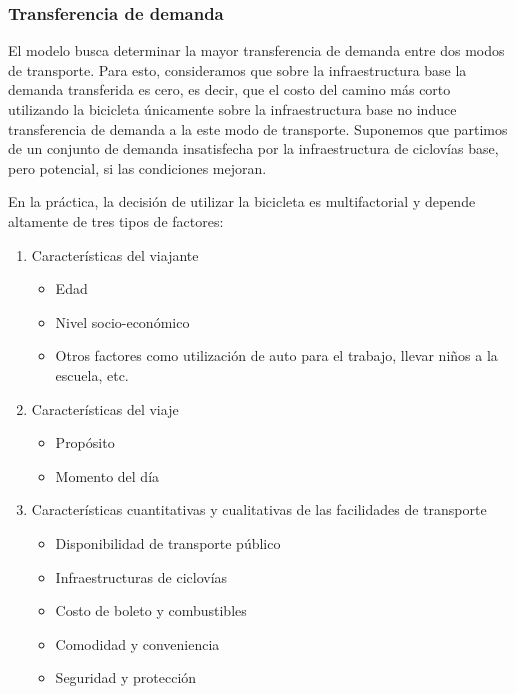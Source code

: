 \documentclass{article}
\begin{document}
  \subsubsection*{Transferencia de demanda}

  El modelo busca determinar la mayor transferencia de demanda entre dos modos de transporte. Para esto, consideramos que sobre la infraestructura base la demanda transferida es cero, es decir, que el costo del camino más corto utilizando la bicicleta únicamente sobre la infraestructura base no induce transferencia de demanda a la este modo de transporte. Suponemos que partimos de un conjunto de demanda insatisfecha por la infraestructura de ciclovías base, pero potencial, si las condiciones mejoran.

  En la práctica, la decisión de utilizar la bicicleta es multifactorial y depende altamente de tres tipos de factores:

  \begin{enumerate}
    \item{
        Características del viajante
          \begin{itemize}
            \item{Edad}
            \item{Nivel socio-económico}
            \item{Otros factores como utilización de auto para el trabajo, llevar niños a la escuela, etc.}
          \end{itemize}
    }
    \item{
        Características del viaje
          \begin{itemize}
            \item{Propósito}
            \item{Momento del día}
          \end{itemize}
    }
    \item{
        Características cuantitativas y cualitativas de las facilidades de transporte
        \begin{itemize}
            \item{Disponibilidad de transporte público}
            \item{Infraestructuras de ciclovías}
            \item{Costo de boleto y combustibles}
            \item{Comodidad y conveniencia}
            \item{Seguridad y protección}
        \end{itemize}
    }
  \end{enumerate}
\end{document}
